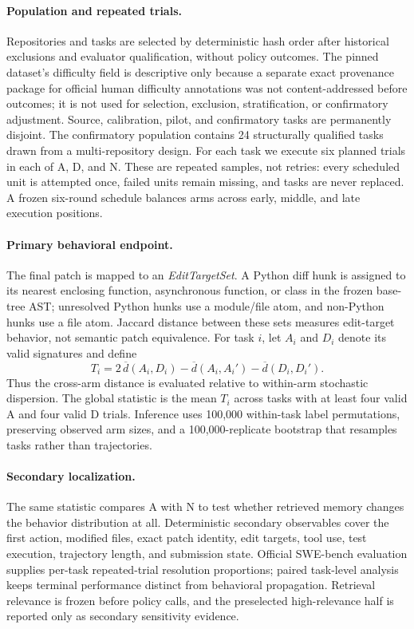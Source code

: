 \paragraph{Population and repeated trials.}
Repositories and tasks are selected by deterministic hash order after historical
exclusions and evaluator qualification, without policy outcomes. The pinned dataset's
difficulty field is descriptive only because a separate exact provenance package for
official human difficulty annotations was not content-addressed before outcomes; it
is not used for selection, exclusion, stratification, or confirmatory adjustment.
Source, calibration, pilot, and confirmatory tasks are permanently disjoint. The
confirmatory population contains 24 structurally qualified tasks drawn from a
multi-repository design. For each task we execute six planned trials in each of
A, D, and N. These are repeated samples, not retries: every scheduled unit is
attempted once, failed units remain missing, and tasks are never replaced. A frozen
six-round schedule balances arms across early, middle, and late execution positions.

\paragraph{Primary behavioral endpoint.}
The final patch is mapped to an \emph{EditTargetSet}. A Python diff hunk is assigned
to its nearest enclosing function, asynchronous function, or class in the frozen
base-tree AST; unresolved Python hunks use a module/file atom, and non-Python hunks
use a file atom. Jaccard distance between these sets measures edit-target behavior,
not semantic patch equivalence. For task $i$, let $A_i$ and $D_i$ denote its valid
signatures and define
\[
T_i =
2\,\overline d(A_i,D_i)
-\overline d(A_i,A_i')
-\overline d(D_i,D_i').
\]
Thus the cross-arm distance is evaluated relative to within-arm stochastic
dispersion. The global statistic is the mean $T_i$ across tasks with at least four
valid A and four valid D trials. Inference uses 100,000 within-task label
permutations, preserving observed arm sizes, and a 100,000-replicate bootstrap that
resamples tasks rather than trajectories.

\paragraph{Secondary localization.}
The same statistic compares A with N to test whether retrieved memory changes the
behavior distribution at all. Deterministic secondary observables cover the first
action, modified files, exact patch identity, edit targets, tool use, test execution,
trajectory length, and submission state. Official SWE-bench evaluation supplies
per-task repeated-trial resolution proportions; paired task-level analysis keeps
terminal performance distinct from behavioral propagation. Retrieval relevance is
frozen before policy calls, and the preselected high-relevance half is reported only
as secondary sensitivity evidence.

